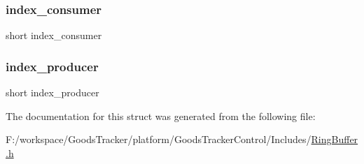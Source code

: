 \mbox{\label{struct_ring_buffer_a4d4eb51c429e7c5750fce746dce85d0a}} 
\subsubsection{\texorpdfstring{index\+\_\+consumer}{index\_consumer}}
{\footnotesize\ttfamily short index\+\_\+consumer}

\mbox{\label{struct_ring_buffer_a839c034ce849f0cd6b5da2440e751a0f}} 
\subsubsection{\texorpdfstring{index\+\_\+producer}{index\_producer}}
{\footnotesize\ttfamily short index\+\_\+producer}



The documentation for this struct was generated from the following file\+:\begin{DoxyCompactItemize}
\item 
F\+:/workspace/\+Goods\+Tracker/platform/\+Goods\+Tracker\+Control/\+Includes/\hyperlink{_ring_buffer_8h}{Ring\+Buffer.\+h}\end{DoxyCompactItemize}
